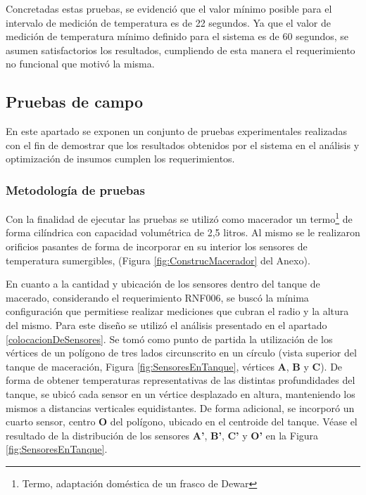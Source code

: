 \par
Concretadas estas pruebas, se evidenció que el valor mínimo posible para el intervalo de medición de temperatura es de 22 segundos. Ya que el valor de medición de temperatura mínimo definido para el sistema es de 60 segundos, se asumen satisfactorios los resultados, cumpliendo de esta manera el requerimiento no funcional que motivó la misma.

\subsection{Pruebas de campo}
\par En este apartado se exponen un conjunto de pruebas experimentales realizadas con el fin de demostrar que los resultados obtenidos por el sistema en el análisis y optimización de insumos cumplen los requerimientos. 

    \subsubsection{Metodología de pruebas}
        \par Con la finalidad de ejecutar las pruebas se utilizó como macerador un termo\footnote{Termo, adaptación doméstica de un frasco de Dewar} de forma cilíndrica con capacidad volumétrica de 2,5 litros. Al mismo se le realizaron orificios pasantes de forma de incorporar en su interior los sensores de temperatura sumergibles, (Figura \ref{fig:ConstrucMacerador} del Anexo).
        
        \par En cuanto a la cantidad y ubicación de los sensores dentro del tanque de macerado, considerando el requerimiento RNF006, se buscó la mínima configuración que permitiese realizar mediciones que cubran el radio y la altura del mismo. Para este diseño se utilizó el análisis presentado en el apartado \ref{colocacionDeSensores}. Se tomó como punto de partida la utilización de los vértices de un polígono de tres lados circunscrito en un círculo (vista superior del tanque de maceración, Figura \ref{fig:SensoresEnTanque}, vértices \textbf{A}, \textbf{B} y \textbf{C}). De forma de obtener temperaturas representativas de las distintas profundidades del tanque, se ubicó cada sensor en un vértice desplazado en altura, manteniendo los mismos a distancias verticales equidistantes. De forma adicional, se incorporó un cuarto sensor, centro \textbf{O} del polígono, ubicado en el centroide del tanque. Véase el resultado de la distribución de los sensores \textbf{A'}, \textbf{B'}, \textbf{C'} y \textbf{O'} en la Figura \ref{fig:SensoresEnTanque}.

